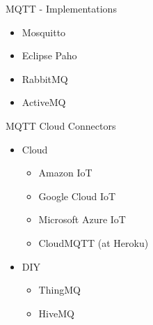 \begin{frame}{MQTT - Implementations}
\protect\hypertarget{mqtt---implementations}{}

\begin{itemize}
\tightlist
\item
  Mosquitto
\item
  Eclipse Paho
\item
  RabbitMQ
\item
  ActiveMQ
\end{itemize}


\end{frame}

\begin{frame}{MQTT Cloud Connectors}
\protect\hypertarget{mqtt-cloud-connectors}{}

\begin{itemize}
\tightlist
\item
  Cloud

  \begin{itemize}
  \tightlist
  \item
    Amazon IoT
  \item
    Google Cloud IoT
  \item
    Microsoft Azure IoT
  \item
    CloudMQTT (at Heroku)
  \end{itemize}
\item
  DIY

  \begin{itemize}
  \tightlist
  \item
    ThingMQ
  \item
    HiveMQ
  \end{itemize}
\end{itemize}


\end{frame}

